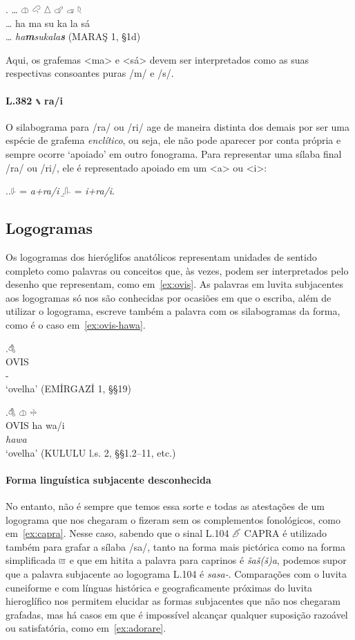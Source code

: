 \exg. \ldots{} \Large 𔓷 \Large 𔒅 \Large 𔖢 \Large 𔗧 \Large 𔓊 \Large 𔗦\\
\ldots{} ha ma su ka la sá\\
\ldots{} \emph{ha\textbf{m}sukala\textbf{s}} (MARAŞ 1, §1d)

Aqui, os grafemas <ma> e <sá> devem ser interpretados como as suas respectivas
consoantes puras /m/ e /s/.

\paragraph{L.382 𔖲 ra\slash{}i} O silabograma para /ra/ ou /ri/ age de maneira
distinta dos demais por ser uma espécie de grafema \emph{enclítico}, ou seja,
ele não pode aparecer por conta própria e sempre ocorre `apoiado' em outro
fonograma.
Para representar uma sílaba final /ra/ ou /ri/, ele é representado apoiado em um
<a> ou <i>:

\ex.\a.{\Large 𔗸} = \emph{a+ra\slash{}i}
\b.{\Large 𔓰} = \emph{i+ra\slash{}i}.


\subsection{Logogramas}

Os logogramas dos hieróglifos anatólicos representam unidades de sentido
completo como palavras ou conceitos que, às vezes, podem ser interpretados pelo
desenho que representam, como em~\ref{ex:ovis}.
As palavras em luvita subjacentes aos logogramas só nos são conhecidas por
ocasiões em que o escriba, além de utilizar o logograma, escreve também a
palavra com os silabogramas da forma, como é o caso em~\ref{ex:ovis-hawa}.

\exg.\label{ex:ovis}\Large 𔒇\\
OVIS\\
-\\
`ovelha' (EMİRGAZİ 1, §§19)

\exg.\label{ex:ovis-hawa}\Large 𔒇 \Large 𔓷 \Large 𔗬\\
OVIS ha wa/i\\
\emph{hawa}\\
`ovelha' (KULULU l.s. 2, §§1.2–11, etc.)


\paragraph{Forma linguística subjacente desconhecida}
No entanto, não é sempre que temos essa sorte e todas as atestações de um
logograma que nos chegaram o fizeram sem os complementos fonológicos, como
em~\ref{ex:capra}. Nesse caso, sabendo que o sinal L.104 𔑶 CAPRA é utilizado
também para grafar a sílaba /sa/, tanto na forma mais pictórica como na forma
simplificada 𔑷 e que em hitita a palavra para caprinos é \emph{šaš{(š)}a}, podemos
supor que a palavra subjacente ao logograma L.104 é \emph{sasa-}.
Comparações com o luvita cuneiforme e com línguas histórica e
geograficamente próximas do luvita hieroglífico nos permitem elucidar as formas
subjacentes que não nos chegaram grafadas, mas há casos em que é impossível
alcançar qualquer suposição razoável ou satisfatória, como em~\ref{ex:adorare}.

